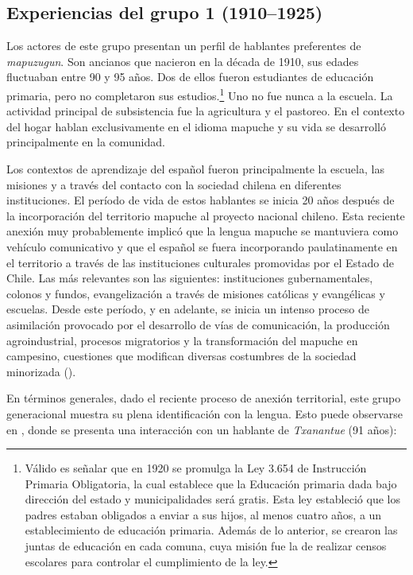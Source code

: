 \documentclass[output=paper]{../langscibook}
\begin{document}
\subsection{Experiencias del grupo 1 (1910--1925)}



Los actores de este grupo presentan un perfil de hablantes preferentes de \textit{mapuzugun}. Son ancianos que nacieron en la década de 1910, sus edades fluctuaban entre 90 y 95 años. Dos de ellos fueron estudiantes de educación primaria, pero no completaron sus estudios.\footnote{Válido es señalar que en 1920 se promulga la Ley 3.654 de Instrucción Primaria Obligatoria, la cual establece que la Educación primaria dada bajo dirección del estado y municipalidades será gratis. Esta ley estableció que los padres estaban obligados a enviar a sus hijos, al menos cuatro años, a un establecimiento de educación primaria. Además de lo anterior, se crearon las juntas de educación en cada comuna, cuya misión fue la de realizar censos escolares para controlar el cumplimiento de la ley.} Uno no fue nunca a la escuela. La actividad principal de subsistencia fue la agricultura y el pastoreo. En el contexto del hogar hablan exclusivamente en el idioma mapuche y su vida se desarrolló principalmente en la comunidad.

Los contextos de aprendizaje del español fueron principalmente la escuela, las misiones y a través del contacto con la sociedad chilena en diferentes instituciones. El período de vida de estos hablantes se inicia 20 años después de la incorporación del territorio mapuche al proyecto nacional chileno. Esta reciente anexión muy probablemente implicó que la lengua mapuche se mantuviera como vehículo comunicativo y que el español se fuera incorporando paulatinamente en el territorio a través de las instituciones culturales promovidas por el Estado de Chile. Las más relevantes son las siguientes: instituciones gubernamentales, colonos y fundos, evangelización a través de misiones católicas y evangélicas y escuelas. Desde este período, y en adelante, se inicia un intenso proceso de asimilación provocado por el desarrollo de vías de comunicación, la producción agroindustrial, procesos migratorios y la transformación del mapuche en campesino, cuestiones que modifican diversas costumbres de la sociedad minorizada (\citealt{ComunidaddeHistoriaMapuche2012,ComunidaddeHistoriaMapuche2015}).

En términos generales, dado el reciente proceso de anexión territorial, este grupo generacional muestra su plena identificación con la lengua. Esto puede observarse en , donde se presenta una interacción con un hablante de \textit{Txanantue} (91 años):
\end{document}
